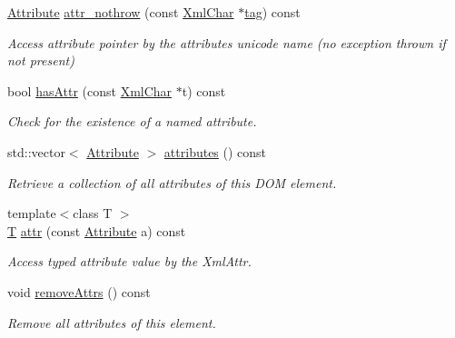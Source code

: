 \begin{DoxyCompactItemize}
\hyperlink{namespace_d_d4hep_1_1_x_m_l_a5c19b7116be99d69b4b22d911357baaf}{Attribute} \hyperlink{class_d_d4hep_1_1_x_m_l_1_1_handle__t_a4d1c61fccb563349e94b1f3f2ebcbf2d}{attr\+\_\+nothrow} (const \hyperlink{namespace_d_d4hep_1_1_x_m_l_a09e5d9cc86ed782f6826dfe0778c1815}{Xml\+Char} $\ast$\hyperlink{class_d_d4hep_1_1_x_m_l_1_1_handle__t_ac935379eb28cd33bc36f19c68da66143}{tag}) const
\begin{DoxyCompactList}\small\item\em Access attribute pointer by the attribute\textquotesingle{}s unicode name (no exception thrown if not present) \end{DoxyCompactList}\item 
bool \hyperlink{class_d_d4hep_1_1_x_m_l_1_1_handle__t_a2b621bfdadc91b393c47791306890ef7}{has\+Attr} (const \hyperlink{namespace_d_d4hep_1_1_x_m_l_a09e5d9cc86ed782f6826dfe0778c1815}{Xml\+Char} $\ast$t) const
\begin{DoxyCompactList}\small\item\em Check for the existence of a named attribute. \end{DoxyCompactList}\item 
std\+::vector$<$ \hyperlink{namespace_d_d4hep_1_1_x_m_l_a5c19b7116be99d69b4b22d911357baaf}{Attribute} $>$ \hyperlink{class_d_d4hep_1_1_x_m_l_1_1_handle__t_a4b3f1f70c1fec3f3c374f68f36cddfa8}{attributes} () const
\begin{DoxyCompactList}\small\item\em Retrieve a collection of all attributes of this D\+OM element. \end{DoxyCompactList}\item 
{\footnotesize template$<$class T $>$ }\\\hyperlink{class_t}{T} \hyperlink{class_d_d4hep_1_1_x_m_l_1_1_handle__t_a5b116e138ee498803385f9ec503395c3}{attr} (const \hyperlink{namespace_d_d4hep_1_1_x_m_l_a5c19b7116be99d69b4b22d911357baaf}{Attribute} a) const
\begin{DoxyCompactList}\small\item\em Access typed attribute value by the Xml\+Attr. \end{DoxyCompactList}\item 
void \hyperlink{class_d_d4hep_1_1_x_m_l_1_1_handle__t_a246861dcf2b68f4093ef295b8e96aaeb}{remove\+Attrs} () const
\begin{DoxyCompactList}\small\item\em Remove all attributes of this element. \end{DoxyCompactList}\item 

\end{DoxyCompactItemize}
